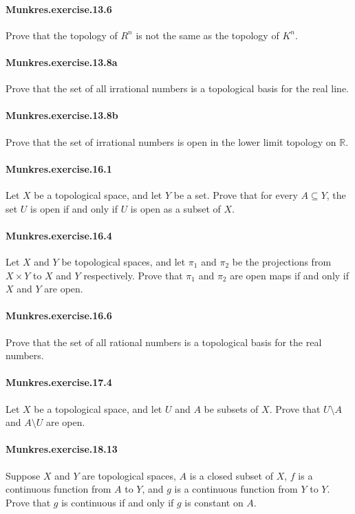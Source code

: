 \documentclass{article}
\begin{document}
\paragraph{Munkres.exercise.13.6} Prove that the topology of $R^n$ is not the same as the topology of $K^n$.

\paragraph{Munkres.exercise.13.8a} Prove that the set of all irrational numbers is a topological basis for the real line.

\paragraph{Munkres.exercise.13.8b} Prove that the set of irrational numbers is open in the lower limit topology on $\mathbb{R}$.

\paragraph{Munkres.exercise.16.1} Let $X$ be a topological space, and let $Y$ be a set. Prove that for every $A \subseteq Y$, the set $U$ is open if and only if $U$ is open as a subset of $X$.

\paragraph{Munkres.exercise.16.4} Let $X$ and $Y$ be topological spaces, and let $\pi_1$ and $\pi_2$ be the projections from $X \times Y$ to $X$ and $Y$ respectively. Prove that $\pi_1$ and $\pi_2$ are open maps if and only if $X$ and $Y$ are open.

\paragraph{Munkres.exercise.16.6} Prove that the set of all rational numbers is a topological basis for the real numbers.

\paragraph{Munkres.exercise.17.4} Let $X$ be a topological space, and let $U$ and $A$ be subsets of $X$. Prove that $U \setminus A$ and $A \setminus U$ are open.

\paragraph{Munkres.exercise.18.13} Suppose $X$ and $Y$ are topological spaces, $A$ is a closed subset of $X$, $f$ is a continuous function from $A$ to $Y$, and $g$ is a continuous function from $Y$ to $Y$. Prove that $g$ is continuous if and only if $g$ is constant on $A$.
\end{document}
